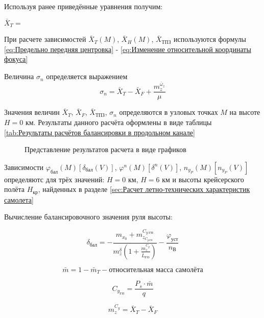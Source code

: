 Используя ранее приведённые уравнения получим:

$\bar{X}_T = $

При расчете зависимостей $\bar{X}_T(M)$, $\bar{X}_H(M)$, $\bar{X}_\text{ТПЗ}$ используются
формулы \ref{eq:Предельно передняя центровка} - \ref{eq:Изменение относительной координаты фокуса} 

Величина $\sigma_n$ определяется выражением 
\begin{equation}
    \label{eq:Коэффициент продольной статической устойчивости по перегрузке}
    \sigma_n = \bar{X}_T - \bar{X}_F + \frac{m_z^{\bar{\omega}_z}}{\mu}
\end{equation}

Значения величин $\bar{X}_T$, $\bar{X}_F$, $\bar{X}_\text{ТПЗ}$,  $\sigma_n$ определяются в узловых точках $M$ на высоте $H = 0$ км. Результаты данного расчёта оформлены в виде таблицы \ref{tab:Результаты расчётов балансировки в продольном канале}  

\begin{figure}[H]
    \caption{Представление результатов расчета в виде графиков}
    \label{fig:Результаты расчётов балансировки в продольном канале}
\end{figure}

Зависимости $\varphi_\text{бал}(M)[\delta_\text{бал}(V)]$, $\varphi^n(M)[\delta^n(V)]$, $n_{y_P}(M)[n_{y_P}(V)]$ определяютс для трёх значений: $H = 0$ км, $H = 6$ км и высоты крейсерского полёта $H_\text{кр}$, найденных в разделе \ref{sec:Расчет летно-технических характеристик самолета} 
\begin{center}
    Вычисление балансировочного значения руля высоты:
\end{center}

\begin{equation}
    \label{eq:Балансировочное значение руля высоты}
    \delta_\text{бал} = -\frac{m_{x_0}+m^{C_{y \ \text{ГП}}}_{z_{C_{y \ \text{ГП}}}}}{m_z^\delta(1 + \frac{m_z^{C_y}}{\bar{L}_\text{ГО}})}-\frac{\varphi_\text{уст}}{n_\text{В}}
\end{equation}

$$\bar{m} = 1 - \bar{m}_T - \text{относительная масса самолёта}$$

\begin{equation}
    \label{eq:ГП балансировка}
    C_{y_\text{ГП}} = \frac{P_s \cdot \bar{m}}{q}
\end{equation}

\begin{equation}
    \label{eq:mzCy}
    m_z^{C_y} = \bar{X}_T - \bar{X}_F
\end{equation}

